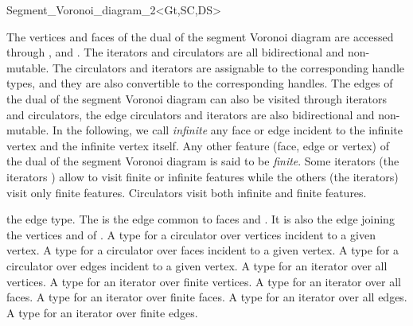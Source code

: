 \begin{ccRefClass}{Segment_Voronoi_diagram_2<Gt,SC,DS>}

The vertices and faces of the dual of the segment Voronoi diagram are
accessed through , 
 and . 
The iterators and circulators
are all bidirectional and non-mutable.
The circulators and iterators are assignable to the 
corresponding handle types, and they are also convertible to the
corresponding handles.
The edges of the dual of the segment Voronoi diagram can also be
visited through iterators and circulators,
the edge circulators and iterators
are also bidirectional and non-mutable.
In the following, we call {\it infinite} any face or edge 
incident  to the infinite vertex and the infinite vertex itself.
Any other feature (face, edge or vertex) of the dual of the segment
Voronoi diagram is said to be {\it finite}.
Some iterators (the  iterators ) allow to visit finite or 
infinite features while the others (the  iterators) visit only
finite features. Circulators visit both infinite and finite features.

%
 {the edge type.
The  is the edge common to faces  and 
. It is also the edge joining the vertices
 and  of .
}
%
{}
%
\ccGlue
{}
\ccGlue
{}
\ccGlue
{}
{A type for a circulator over vertices incident to a given vertex.}
\ccGlue
{}
{A type for a circulator over faces incident to a given vertex.}
\ccGlue
{}
{A type for a circulator over edges incident to a given vertex.}
\ccGlue
{}
{A type for an iterator over all vertices.}
\ccGlue
{}
{A type for an iterator over finite vertices.}
\ccGlue
{}
{A type for an iterator over all faces.}
\ccGlue
{}
{A type for an iterator over finite faces.}
\ccGlue
{}
{A type for an iterator over all edges.}
\ccGlue
{}
{A type for an iterator over finite edges.}



\end{ccRefClass}
